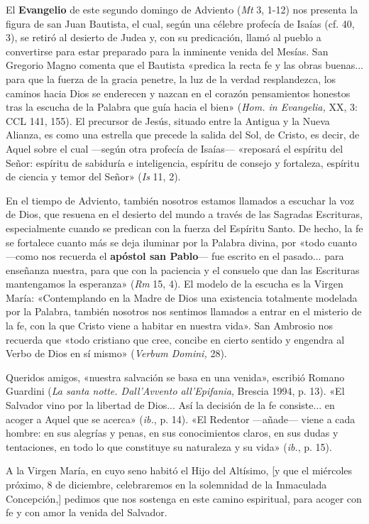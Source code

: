 \documentclass[]{article}
\begin{document}
El \textbf{Evangelio} de este segundo domingo de Adviento (\emph{Mt} 3,
1-12) nos presenta la figura de san Juan Bautista, el cual, según una
célebre profecía de Isaías (cf. 40, 3), se retiró al desierto de Judea
y, con su predicación, llamó al pueblo a convertirse para estar
preparado para la inminente venida del Mesías. San Gregorio Magno
comenta que el Bautista «predica la recta fe y las obras buenas... para
que la fuerza de la gracia penetre, la luz de la verdad resplandezca,
los caminos hacia Dios se enderecen y nazcan en el corazón pensamientos
honestos tras la escucha de la Palabra que guía hacia el bien»
(\emph{Hom. in Evangelia,} XX, 3: CCL 141, 155). El precursor de Jesús,
situado entre la Antigua y la Nueva Alianza, es como una estrella que
precede la salida del Sol, de Cristo, es decir, de Aquel sobre el cual
---según otra profecía de Isaías--- «reposará el espíritu del Señor:
espíritu de sabiduría e inteligencia, espíritu de consejo y fortaleza,
espíritu de ciencia y temor del Señor» (\emph{Is} 11, 2).

En el tiempo de Adviento, también nosotros estamos llamados a escuchar
la voz de Dios, que resuena en el desierto del mundo a través de las
Sagradas Escrituras, especialmente cuando se predican con la fuerza del
Espíritu Santo. De hecho, la fe se fortalece cuanto más se deja iluminar
por la Palabra divina, por «todo cuanto ---como nos recuerda el
\textbf{apóstol san Pablo}--- fue escrito en el pasado... para enseñanza
nuestra, para que con la paciencia y el consuelo que dan las Escrituras
mantengamos la esperanza» (\emph{Rm} 15, 4). El modelo de la escucha es
la Virgen María: «Contemplando en la Madre de Dios una existencia
totalmente modelada por la Palabra, también nosotros nos sentimos
llamados a entrar en el misterio de la fe, con la que Cristo viene a
habitar en nuestra vida». San Ambrosio nos recuerda que «todo cristiano
que cree, concibe en cierto sentido y engendra al Verbo de Dios en sí
mismo» (\emph{Verbum Domini,} 28).

Queridos amigos, «nuestra salvación se basa en una venida», escribió
Romano Guardini (\emph{La santa notte. Dall'Avvento all'Epifania},
Brescia 1994, p. 13). «El Salvador vino por la libertad de Dios... Así
la decisión de la fe consiste... en acoger a Aquel que se acerca»
(\emph{ib.}, p. 14). «El Redentor ---añade--- viene a cada hombre: en
sus alegrías y penas, en sus conocimientos claros, en sus dudas y
tentaciones, en todo lo que constituye su naturaleza y su vida»
(\emph{ib.}, p. 15).

A la Virgen María, en cuyo seno habitó el Hijo del Altísimo, {[}y que el
miércoles próximo, 8 de diciembre, celebraremos en la solemnidad de la
Inmaculada Concepción,{]} pedimos que nos sostenga en este camino
espiritual, para acoger con fe y con amor la venida del Salvador.
\end{document}
